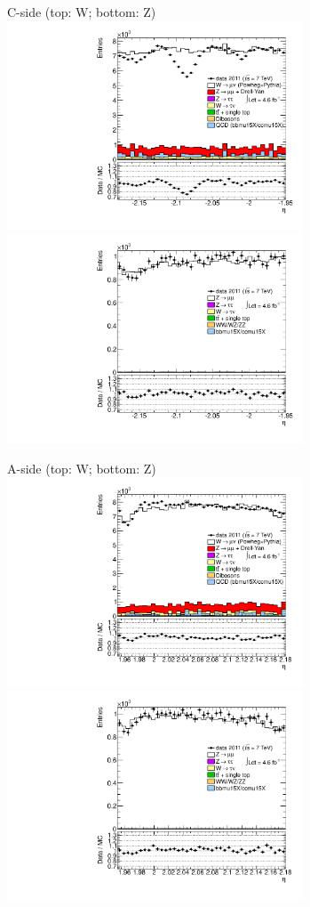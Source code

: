 {

\colb[T]

C-side (top: W; bottom: Z)
\centering
\includegraphics[width=0.66\textwidth]{dates/20130306/figures/etaphi/W_10_C_stack_l_eta_NEG} \\
\includegraphics[width=0.66\textwidth]{dates/20130306/figures/etaphi/Z_10_C_stack_lN_eta_ALL.pdf}

A-side (top: W; bottom: Z)
\centering
\includegraphics[width=0.66\textwidth]{dates/20130306/figures/etaphi/W_10_A_stack_l_eta_NEG} \\
\includegraphics[width=0.66\textwidth]{dates/20130306/figures/etaphi/Z_10_A_stack_lN_eta_ALL.pdf} 

\cole
}


